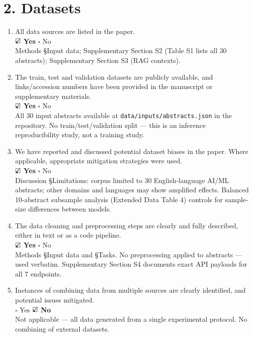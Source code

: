 \documentclass[11pt]{article}
\newcommand{\yes}{\rlap{$\checkmark$}\square}
\newcommand{\no}{\square}
\begin{document}
\section*{2. Datasets}

\begin{enumerate}[label=\Alph*.,leftmargin=2em]
\item All data sources are listed in the paper.\\
$\yes$ \textbf{Yes} \quad $\no$ No\\
{\small Methods \S Input data; Supplementary Section S2 (Table S1 lists all 30 abstracts); Supplementary Section S3 (RAG contexts).}

\item The train, test and validation datasets are publicly available, and links/accession numbers have been provided in the manuscript or supplementary materials.\\
$\yes$ \textbf{Yes} \quad $\no$ No\\
{\small All 30 input abstracts available at \texttt{data/inputs/abstracts.json} in the repository. No train/test/validation split --- this is an inference reproducibility study, not a training study.}

\item We have reported and discussed potential dataset biases in the paper. Where applicable, appropriate mitigation strategies were used.\\
$\yes$ \textbf{Yes} \quad $\no$ No\\
{\small Discussion \S Limitations: corpus limited to 30 English-language AI/ML abstracts; other domains and languages may show amplified effects. Balanced 10-abstract subsample analysis (Extended Data Table 4) controls for sample-size differences between models.}

\item The data cleaning and preprocessing steps are clearly and fully described, either in text or as a code pipeline.\\
$\yes$ \textbf{Yes} \quad $\no$ No\\
{\small Methods \S Input data and \S Tasks. No preprocessing applied to abstracts --- used verbatim. Supplementary Section S4 documents exact API payloads for all 7 endpoints.}

\item Instances of combining data from multiple sources are clearly identified, and potential issues mitigated.\\
$\no$ Yes \quad $\yes$ \textbf{No}\\
{\small Not applicable --- all data generated from a single experimental protocol. No combining of external datasets.}
\end{enumerate}
\end{document}
